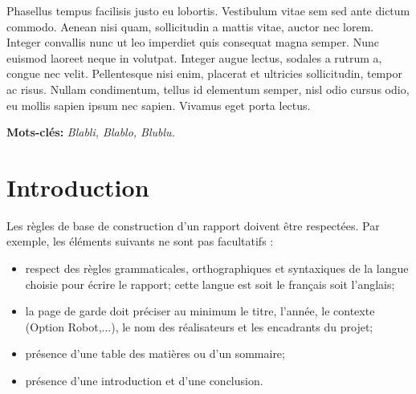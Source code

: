 \documentclass[a4paper,11pt]{scrbook}
\begin{document}
Phasellus tempus facilisis justo eu lobortis. Vestibulum vitae sem sed ante dictum commodo. Aenean nisi quam, sollicitudin a mattis vitae, auctor nec lorem. Integer convallis nunc ut leo imperdiet quis consequat magna semper. Nunc euismod laoreet neque in volutpat. Integer augue lectus, sodales a rutrum a, congue nec velit. Pellentesque nisi enim, placerat et ultricies sollicitudin, tempor ac risus. Nullam condimentum, tellus id elementum semper, nisl odio cursus odio, eu mollis sapien ipsum nec sapien. Vivamus eget porta lectus.


\vfill
\noindent
\textbf{Mots-clés: }\emph{Blabli, Blablo, Blublu.}

\tableofcontents

\listoffigures
{}

\mainmatter

\chapter*{Introduction}

Les règles de base de construction d'un rapport doivent être respectées. Par exemple, les éléments suivants ne sont pas facultatifs :
\begin{itemize}
\item respect des règles grammaticales, orthographiques et syntaxiques de la langue choisie pour écrire le rapport; cette langue est soit le français soit l'anglais;
\item la page de garde doit préciser au minimum le titre, l'année, le contexte (Option Robot,...), le nom des réalisateurs et les encadrants du projet;
\item présence d'une table des matières ou d'un sommaire;
\item présence d'une introduction et d'une conclusion.
\end{itemize}
\end{document}
